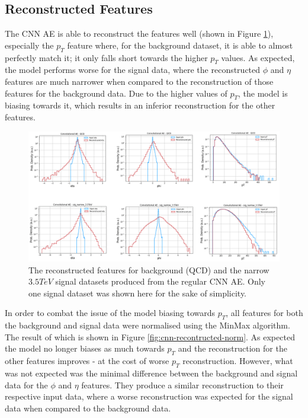 \documentclass[a4paper]{article}
\theoremstyle{plain}
\theoremstyle{definition}
\begin{document}
        \subsection{Reconstructed Features}

            The CNN AE is able to reconstruct the features well (shown in Figure \ref{fig:cnn-reconstructed}), especially the $p_T$ feature where, for the background dataset, it is able to almost perfectly match it; it only falls short towards the higher $p_T$ values. As expected, the model performs worse for the signal data, where the reconstructed $\phi$ and $\eta$ features are much narrower when compared to the reconstruction of those features for the background data. Due to the higher values of $p_T$, the model is biasing towards it, which results in an inferior reconstruction for the other features.

            \begin{figure}[H]
                \centering
                \begin{minipage}[b]{\linewidth}
                    \centering
                    \includegraphics[width=\textwidth]{cnn.png}
                    \caption{The reconstructed features for background (QCD) and the narrow $3.5 TeV$ signal datasets produced from the regular CNN AE. Only one signal dataset was shown here for the sake of simplicity.}
                    \label{fig:cnn-reconstructed}
                \end{minipage}
            \end{figure}

            In order to combat the issue of the model biasing towards $p_T$, all features for both the background and signal data were normalised using the MinMax algorithm. The result of which is shown in Figure \ref{fig:cnn-recontructed-norm}. As expected the model no longer biases as much towards $p_T$ and the reconstruction for the other features improves - at the cost of worse $p_T$ reconstruction. However, what was not expected was the minimal difference between the background and signal data for the $\phi$ and $\eta$ features. They produce a similar reconstruction to their respective input data, where a worse reconstruction was expected for the signal data when compared to the background data. 
\end{document}
